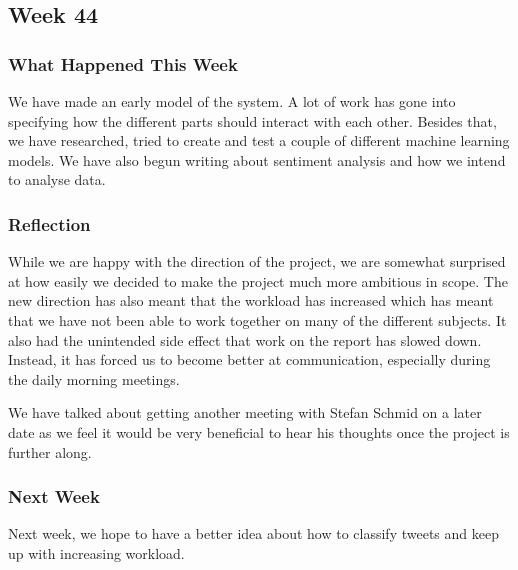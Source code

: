 \subsection{Week 44}
\subsubsection{What Happened This Week}
We have made an early model of the system. A lot of work has gone into
specifying how the different parts should interact with each other. Besides that,
we have researched, tried to create and test a couple of different machine
learning models. We have also begun writing about sentiment analysis and how we
intend to analyse data.

\subsubsection{Reflection}
While we are happy with the direction of the project, we are somewhat surprised
at how easily we decided to make the project much more ambitious in scope. The
new direction has also meant that the workload has increased which has meant
that we have not been able to work together on many of the different subjects.
It also had the unintended side effect that work on the report has slowed down.
Instead, it has forced us to become better at communication, especially during
the daily morning meetings.\nl

We have talked about getting another meeting with Stefan Schmid on a later
date as we feel it would be very beneficial to hear his thoughts once the
project is further along.

\subsubsection{Next Week} 
Next week, we hope to have a better idea about how to classify tweets and
keep up with increasing workload.

